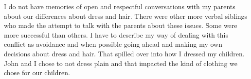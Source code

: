 I do not have memories of open and respectful conversations with my parents about our differences about dress and hair. There were other more verbal siblings who made the attempt to talk with the parents about these issues. Some were more successful than others. I have to describe my way of dealing with this conflict as avoidance and when possible going ahead and making my own decisions about dress and hair. That spilled over into how I dressed my children. John and I chose to not dress plain and that impacted the kind of clothing we chose for our children.




